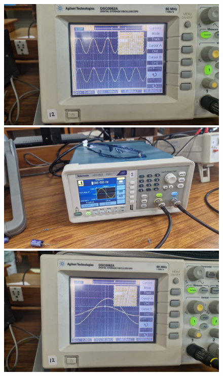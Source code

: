 \documentclass[a4paper,12pt]{article}
\begin{document}
\begin{figure}[h]
    \begin{minipage}{0.3\textwidth}
        \centering
        \includegraphics[width=\textwidth]{fig/Fig1 (7).jpg}
    \end{minipage}
    \begin{minipage}{0.3\textwidth}
        \centering
        \includegraphics[width=\textwidth]{fig/Fig1 (8).jpg}
    \end{minipage}
    \begin{minipage}{0.3\textwidth}
        \centering
        \includegraphics[width=\textwidth]{fig/Fig1 (9).jpg}
    \end{minipage}


\end{figure}
\end{document}
